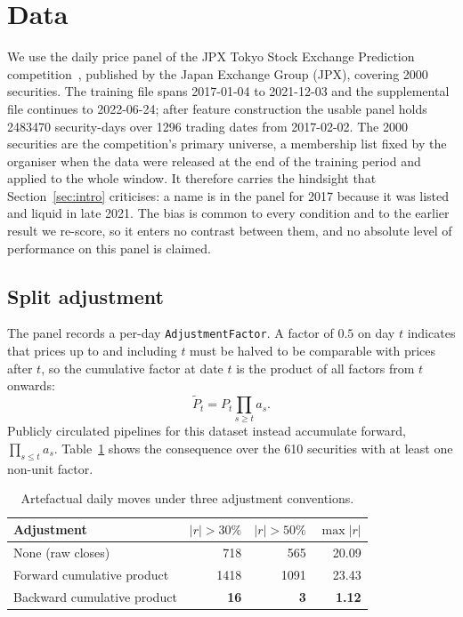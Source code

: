 \section{Data}
\label{sec:data}

We use the daily price panel of the JPX Tokyo Stock Exchange Prediction
competition~\citep{jpx2022competition}, published by the Japan Exchange Group
(JPX), covering \num{2000} securities. The training file spans 2017-01-04 to 2021-12-03 and the
supplemental file continues to 2022-06-24; after feature construction the
usable panel holds \num{2483470} security-days over \num{1296} trading dates
from 2017-02-02. The \num{2000} securities are the competition's primary
universe, a membership list fixed by the organiser when the data were released
at the end of the training period and applied to the whole window. It therefore
carries the hindsight that Section~\ref{sec:intro} criticises: a name is in the
panel for 2017 because it was listed and liquid in late 2021. The bias is common
to every condition and to the earlier result we re-score, so it enters no
contrast between them, and no absolute level of performance on this panel is
claimed.

\subsection{Split adjustment}
\label{sec:data:adjustment}
The panel records a per-day \texttt{AdjustmentFactor}. A factor of $0.5$ on day
$t$ indicates that prices up to and including $t$ must be halved to be
comparable with prices after $t$, so the cumulative factor at date $t$ is the
product of all factors from $t$ onwards:
\begin{equation}
  \tilde{P}_t = P_t \prod_{s \ge t} a_s .
\end{equation}
Publicly circulated pipelines for this dataset instead accumulate forward,
$\prod_{s \le t} a_s$. Table~\ref{tab:adjustment} shows the consequence over the
\num{610} securities with at least one non-unit factor.

\begin{table}[t]
\centering
\caption{Artefactual daily moves under three adjustment conventions.}
\label{tab:adjustment}
\begin{tabular}{lrrr}
\toprule
Adjustment & $|r|>30\%$ & $|r|>50\%$ & $\max |r|$ \\
\midrule
None (raw closes)            & 718  & 565  & 20.09 \\
Forward cumulative product   & 1418 & 1091 & 23.43 \\
Backward cumulative product  & \textbf{16} & \textbf{3} & \textbf{1.12} \\
\bottomrule
\end{tabular}
\end{table}

